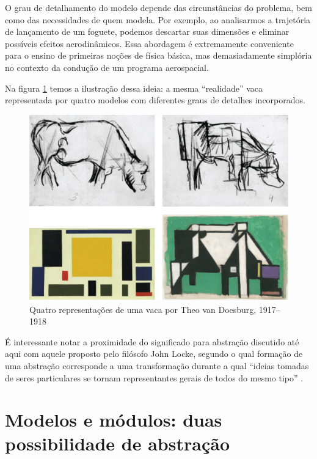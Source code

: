 O grau de detalhamento do modelo depende das circunstâncias do problema, bem como das necessidades de quem modela. Por exemplo, ao analisarmos a trajetória de lançamento de um foguete, podemos descartar suas dimensões e eliminar possíveis efeitos aerodinâmicos. Essa abordagem é extremamente conveniente para o ensino de primeiras noções de física básica, mas demasiadamente simplória no contexto da condução de um programa aerospacial.

Na figura \ref{fig:cows} temos a ilustração dessa ideia: a mesma ``realidade'' vaca representada por quatro modelos com diferentes graus de detalhes incorporados.

\begin{figure}[htb]
	\caption{Quatro representações de uma vaca por Theo van Doesburg, 1917--1918}
	\begin{center}
	    \includegraphics[scale=0.26]{imagens/vacas.png}
	\end{center}
	\label{fig:cows}
\end{figure}

É interessante notar a proximidade do significado para abstração discutido até aqui com aquele proposto pelo filósofo John Locke, segundo o qual formação de uma abstração corresponde a uma transformação durante a qual ``ideias tomadas de seres particulares se tornam representantes gerais de todos do mesmo tipo'' .

\section{Modelos e módulos: duas possibilidade de abstração}

